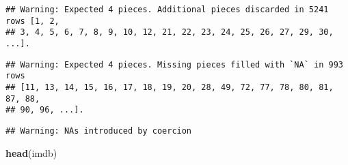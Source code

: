 \documentclass[]{article}
\newenvironment{Shaded}{\begin{snugshade}}{\end{snugshade}}
\newcommand{\DataTypeTok}[1]{\textcolor[rgb]{0.13,0.29,0.53}{#1}}
\newcommand{\DecValTok}[1]{\textcolor[rgb]{0.00,0.00,0.81}{#1}}
\newcommand{\KeywordTok}[1]{\textcolor[rgb]{0.13,0.29,0.53}{\textbf{#1}}}
\newcommand{\NormalTok}[1]{#1}
\newcommand{\OperatorTok}[1]{\textcolor[rgb]{0.81,0.36,0.00}{\textbf{#1}}}
\newcommand{\OtherTok}[1]{\textcolor[rgb]{0.56,0.35,0.01}{#1}}
\newcommand{\StringTok}[1]{\textcolor[rgb]{0.31,0.60,0.02}{#1}}
\begin{document}
\begin{Shaded}
\end{Shaded}

\begin{verbatim}
## Warning: Expected 4 pieces. Additional pieces discarded in 5241 rows [1, 2,
## 3, 4, 5, 6, 7, 8, 9, 10, 12, 21, 22, 23, 24, 25, 26, 27, 29, 30, ...].
\end{verbatim}

\begin{verbatim}
## Warning: Expected 4 pieces. Missing pieces filled with `NA` in 993 rows
## [11, 13, 14, 15, 16, 17, 18, 19, 20, 28, 49, 72, 77, 78, 80, 81, 87, 88,
## 90, 96, ...].
\end{verbatim}

\begin{verbatim}
## Warning: NAs introduced by coercion
\end{verbatim}

\begin{Shaded}
\begin{Highlighting}[]
\KeywordTok{head}\NormalTok{(imdb)}
\end{Highlighting}
\end{Shaded}
\end{document}
